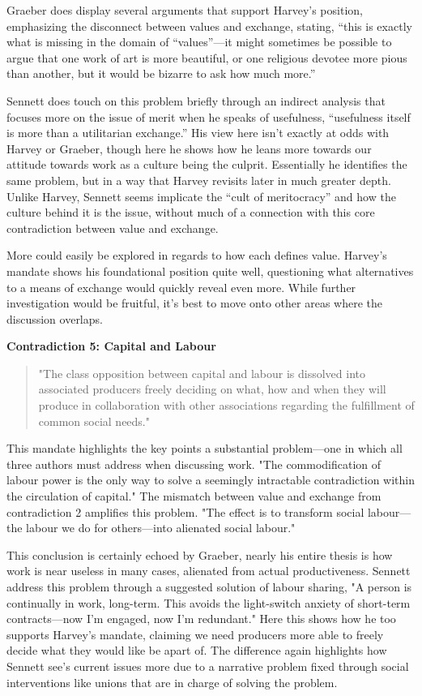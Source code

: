 \documentclass[12pt,a4paper]{article}
\begin{document}
Graeber does display several arguments that support Harvey’s position, emphasizing the disconnect between values and exchange, stating, “this is exactly what is missing in the domain of “values”---it might sometimes be possible to argue that one work of art is more beautiful, or one religious devotee more pious than another, but it would be bizarre to ask how much more.” \cite{bs}
\vspace*{10pt}

Sennett does touch on this problem briefly through an indirect analysis that focuses more on the issue of merit when he speaks of usefulness, “usefulness itself is more than a utilitarian exchange.” \cite{new} His view here isn’t exactly at odds with Harvey or Graeber, though here he shows how he leans more towards our attitude towards work as a culture being the culprit. Essentially he identifies the same problem, but in a way that Harvey revisits later in much greater depth. Unlike Harvey, Sennett seems implicate the “cult of meritocracy” \cite{new} and how the culture behind it is the issue, without much of a connection with this core contradiction between value and exchange.

More could easily be explored in regards to how each defines value. Harvey's mandate shows his foundational position quite well, questioning what alternatives to a means of exchange would quickly reveal even more. While further investigation would be fruitful, it's best to move onto other areas where the discussion overlaps. 

\textbf{Contradiction 5: Capital and Labour}
\begin{quotation} {\color{G-Moon}
    \noindent "The class opposition between capital and labour is dissolved into associated producers freely deciding on what, how and when they will produce in collaboration with other associations regarding the fulfillment of common social needs." \cite{con}}
\end{quotation}
This mandate highlights the key points a substantial problem---one in which all three authors must address when discussing work. "The commodification of labour power is the only way to solve a seemingly intractable contradiction within the circulation of capital." \cite{con} The mismatch between value and exchange from contradiction 2 amplifies this problem. "The effect is to transform social labour---the labour we do for others---into alienated social labour." \cite{con} 
\vspace*{10pt}

This conclusion is certainly echoed by Graeber, nearly his entire thesis is how work is near useless in many cases, alienated from actual productiveness. Sennett address this problem through a suggested solution of labour sharing, "A person is continually in work, long-term. This avoids the light-switch anxiety of short-term contracts---now I’m engaged, now I’m redundant." \cite{new} Here this shows how he too supports Harvey's mandate, claiming we need producers more able to freely decide what they would like be apart of. The difference again highlights how Sennett see's current issues more due to a narrative problem fixed through social interventions like unions that are in charge of solving the problem.
\end{document}
